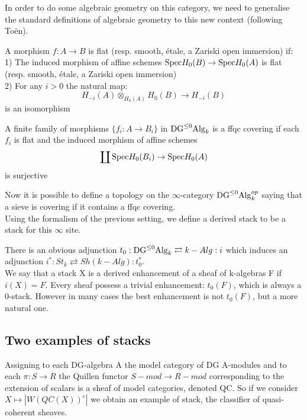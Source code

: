 \begin{refsection}
In order to do some algebraic geometry on this category, we need to generalise the standard definitions of algebraic geometry to this new context (following To\"en).\\
\begin{defin}
  \label{definition:flat-smooth-etale-zariski-immersion-derived}
A morphism $f:A\to B$ is flat (resp. smooth, \'etale, a Zariski open immersion) if:\\
1) The induced morphism of affine schemes $\mathrm{Spec} H_0(B)\to \mathrm{Spec} H_0(A)$ is flat (resp. smooth, \'etale, a Zariski open immersion)\\
2) For any $i>0$ the natural map:
$$H_{-i}(A)\otimes_{H_0(A)}H_0(B)\to H_{-i}(B) $$
is an isomorphism
\end{defin}


\begin{defin}
A finite family of morphisms $\{ f_i:A\to B_i\}$ in $\mathrm{DG}^{\le 0}\mathrm{Alg}_k$ is a ffqc covering if each $f_i$ is flat and the induced morphism of affine schemes
$$\coprod \mathrm{Spec} H_0(B_i)\to \mathrm{Spec} H_0(A)$$
is surjective
\end{defin}

Now it is possible to define a topology on the $\infty$-category $\mathrm{DG}^{\le 0}\mathrm{Alg}_k^{op}$ saying that a sieve is covering if it contains a ffqc covering.\\
Using the formalism of the previous setting, we define a derived stack to be a stack for this $\infty$ site.\\


\begin{rmk}
There is an obvious adjunction $t_0:\mathrm{DG}^{\le 0}\mathrm{Alg}_k\rightleftarrows k-Alg:i$ which induces an adjunction $i^*:St_k\rightleftarrows Sh(k-Alg):t_0^*$.\\
We say that a stack X is a derived enhancement of a sheaf of k-algebras F if $i(X)=F$. Every sheaf possess a trivial enhancement: $t_0(F)$, which
is always a 0-stack.
However in many cases the best enhancement is not $t_0(F)$, but a more natural one.
\end{rmk}


\subsection{Two examples of stacks}

\begin{defin}
Assigning to each DG-algebra A the model category of DG A-modules and to each $\pi: S\to R$ the Quillen functor $S-mod\to R-mod$ corresponding to the extension of scalars
is a sheaf of model categories, denoted QC. So if we consider $X\mapsto |W(QC(X))^c|$ we obtain an example of stack, the classifier of quasi-coherent sheaves. 
\end{defin}


\end{refsection}
